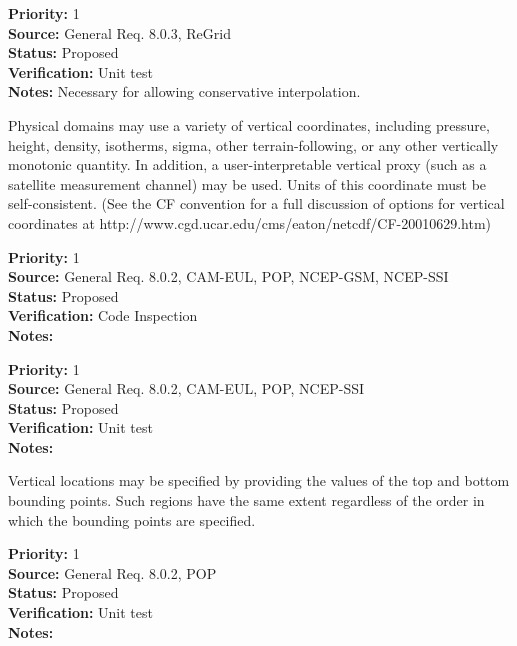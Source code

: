 \begin{reqlist}
{\bf Priority:} 1 \\
{\bf Source:} General Req. 8.0.3, ReGrid \\
{\bf Status:} Proposed \\
{\bf Verification:} Unit test\\
{\bf Notes:} Necessary for allowing conservative interpolation.
\end{reqlist}



Physical domains may use a variety of vertical coordinates, including pressure,
height, density, isotherms, sigma, other terrain-following, or any other
vertically monotonic quantity.  In addition, a user-interpretable vertical
proxy (such as a satellite measurement channel) may be used.  Units of this
coordinate must be self-consistent.  (See the CF convention for a full
discussion of options for vertical coordinates at
http://www.cgd.ucar.edu/cms/eaton/netcdf/CF-20010629.htm)
\begin{reqlist}
{\bf Priority:} 1 \\
{\bf Source:} General Req. 8.0.2, CAM-EUL, POP, NCEP-GSM, NCEP-SSI \\
{\bf Status:} Proposed \\
{\bf Verification:} Code Inspection\\
{\bf Notes:} 
\end{reqlist}

\begin{reqlist}
{\bf Priority:} 1 \\
{\bf Source:} General Req. 8.0.2, CAM-EUL, POP, NCEP-SSI \\
{\bf Status:} Proposed \\
{\bf Verification:} Unit test\\
{\bf Notes:} 
\end{reqlist}


Vertical locations may be specified by providing the values of the top and
bottom bounding points.  Such regions have the same extent regardless of the
order in which the bounding points are specified.
\begin{reqlist}
{\bf Priority:} 1 \\
{\bf Source:} General Req. 8.0.2, POP \\
{\bf Status:} Proposed \\
{\bf Verification:} Unit test\\
{\bf Notes:} 
\end{reqlist}

